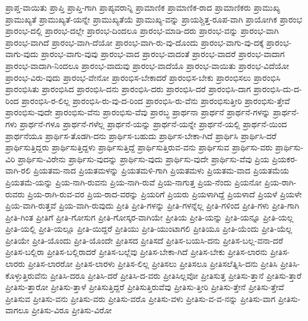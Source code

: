 {ಪ್ರಾಪ್ತ-ವಾಯಿತು
ಪ್ರಾಪ್ತಿ
ಪ್ರಾಪ್ತಿ-ಗಾಗಿ
ಪ್ರಾಪ್ಯವರಾನ್ನಿ
ಪ್ರಾಮಾಣಿಕ
ಪ್ರಾಮಾಣಿಕ-ರಾದ
ಪ್ರಾಮಾಣಿಕರು
ಪ್ರಾಮುಖ್ಯ
ಪ್ರಾಮುಖ್ಯತೆ
ಪ್ರಾಮುಖ್ಯತೆ-ಯನ್ನೇ
ಪ್ರಾಮುಖ್ಯತೆಯೆ
ಪ್ರಾಮುಖ್ಯ-ವನ್ನು
ಪ್ರಾಯಶ್ಚಿತ್ತ-ರೂಪ-ವಾಗಿ
ಪ್ರಾಯೋಗಿಕ
ಪ್ರಾರಂಭ
ಪ್ರಾರಂಭ-ದಲ್ಲಿ
ಪ್ರಾರಂಭ-ದಲ್ಲೇ
ಪ್ರಾರಂಭ-ದಿಂದಲೂ
ಪ್ರಾರಂಭ-ಮಾಡಿ-ದರು
ಪ್ರಾರಂಭ-ವನ್ನು
ಪ್ರಾರಂಭ-ವಾಗಿ
ಪ್ರಾರಂಭ-ವಾಗಿದೆ
ಪ್ರಾರಂಭ-ವಾಗಿ-ದೆಯೋ
ಪ್ರಾರಂಭ-ವಾಗಿ-ರು-ವು-ದೊಂದು
ಪ್ರಾರಂಭ-ವಾಗು-ವು-ದಕ್ಕೆ
ಪ್ರಾರಂಭ-ವಾಗು-ವುದು
ಪ್ರಾರಂಭ-ವಾಗು-ವುವು
ಪ್ರಾರಂಭ-ವಾದ
ಪ್ರಾರಂಭ-ವಾದಂತೆ
ಪ್ರಾರಂಭ-ವಾದರೆ
ಪ್ರಾರಂಭ-ವಾದಾಗ
ಪ್ರಾರಂಭ-ವಾದಾಗಿ-ನಿಂದಲೂ
ಪ್ರಾರಂಭ-ವಾದುವು
ಪ್ರಾರಂಭ-ವಾದೆಯೊ
ಪ್ರಾರಂಭ-ವಾಯಿತು
ಪ್ರಾರಂಭ-ವಿದೆಯೋ
ಪ್ರಾರಂಭ-ವಿರು-ವುದು
ಪ್ರಾರಂಭ-ವೇನೋ
ಪ್ರಾರಂಭಿಸ-ಬೇಕಾದರೆ
ಪ್ರಾರಂಭಿಸ-ಬೇಕು
ಪ್ರಾರಂಭಿಸಲು
ಪ್ರಾರಂಭಿಸಿ
ಪ್ರಾರಂಭಿಸಿತು
ಪ್ರಾರಂಭಿಸಿದ
ಪ್ರಾರಂಭಿಸಿ-ದನು
ಪ್ರಾರಂಭಿಸಿ-ದರು
ಪ್ರಾರಂಭಿಸಿ-ದರೆ
ಪ್ರಾರಂಭಿಸಿ-ದಾಗ
ಪ್ರಾರಂಭಿಸಿ-ದು-ದ-ರಿಂದ
ಪ್ರಾರಂಭಿಸಿ-ರ-ಲಿಲ್ಲ
ಪ್ರಾರಂಭಿಸಿ-ರು-ವು-ದ-ರಿಂದ
ಪ್ರಾರಂಭಿಸಿ-ರು-ವೆನು
ಪ್ರಾರಂಭಿಸುತ್ತೀರಿ
ಪ್ರಾರಂಭಿಸು-ತ್ತೇವೆ
ಪ್ರಾರಂಭಿಸು-ವುದೇ
ಪ್ರಾರಂಭಿಸು-ವೆನು
ಪ್ರಾರಂಭಿಸು-ವೆವು
ಪ್ರಾರಬ್ಧ
ಪ್ರಾರ್ಥನಾ
ಪ್ರಾರ್ಥನೆ
ಪ್ರಾರ್ಥನೆ-ಗಳನ್ನು
ಪ್ರಾರ್ಥನೆ-ಗಳು
ಪ್ರಾರ್ಥನೆ-ಗಳೂ
ಪ್ರಾರ್ಥನೆ-ಗಳೆಲ್ಲ
ಪ್ರಾರ್ಥನೆ-ಯನ್ನು
ಪ್ರಾರ್ಥನೆ-ಯನ್ನೇ
ಪ್ರಾರ್ಥನೆ-ಯಲ್ಲಿ
ಪ್ರಾರ್ಥನೆ-ಯಿಂದ
ಪ್ರಾರ್ಥನೆಯೂ
ಪ್ರಾರ್ಥಿಸ-ತೊಡಗಿ-ದನು
ಪ್ರಾರ್ಥಿಸ-ಬಹುದು
ಪ್ರಾರ್ಥಿಸ-ಬೇಕಾ-ಗಿದೆ
ಪ್ರಾರ್ಥಿಸಿ
ಪ್ರಾರ್ಥಿಸಿ-ದರೆ
ಪ್ರಾರ್ಥಿಸುತ್ತಿದ್ದರು
ಪ್ರಾರ್ಥಿಸುತ್ತಿದ್ದಳು
ಪ್ರಾರ್ಥಿಸುತ್ತಿದ್ದೆ
ಪ್ರಾರ್ಥಿಸುತ್ತಿರುವ-ವನು
ಪ್ರಾರ್ಥಿಸುವ
ಪ್ರಾರ್ಥಿಸು-ವರು
ಪ್ರಾರ್ಥಿಸು-ವಿರಿ
ಪ್ರಾರ್ಥಿಸು-ವಿರೇನು
ಪ್ರಾರ್ಥಿಸು-ವುದನ್ನು
ಪ್ರಾರ್ಥಿಸು-ವುದು
ಪ್ರಾರ್ಥಿಸು-ವುದೇ
ಪ್ರಾರ್ಥಿಸು-ವೆವು
ಪ್ರಿಯ
ಪ್ರಿಯಕರ-ವಾಗಿ-ರಲಿ
ಪ್ರಿಯತಮ-ನಾದ
ಪ್ರಿಯತಮಳನ್ನು
ಪ್ರಿಯತಮಳಿ-ಗಾಗಿ
ಪ್ರಿಯತಮಳು
ಪ್ರಿಯತಮ-ವಾದ
ಪ್ರಿಯತಮೆಯ
ಪ್ರಿಯತಮೆ-ಯನ್ನು
ಪ್ರಿಯ-ನಾಗಿ-ರುವನು
ಪ್ರಿಯ-ನಾಗಿ-ರುವೆ
ಪ್ರಿಯ-ನಾಗುತ್ತ
ಪ್ರಿಯ-ನೆಂದು
ಪ್ರಿಯನೋ
ಪ್ರಿಯ-ರಾಗಿ-ರುವರು
ಪ್ರಿಯ-ರಾಗಿ-ರುವ-ವರ
ಪ್ರಿಯ-ರಾದ-ವರನ್ನು
ಪ್ರಿಯರಿಗೆ
ಪ್ರಿಯರು
ಪ್ರಿಯಳಾಗಿದ್ದೆ
ಪ್ರಿಯಳಾದೆ
ಪ್ರಿಯಳೆ
ಪ್ರಿಯಳೇ
ಪ್ರಿಯ-ವಾಗಿ-ರುತ್ತವೆ
ಪ್ರಿಯ-ವಾಗಿ-ರುವುದು
ಪ್ರೀತಿ
ಪ್ರೀತಿ-ಗಳನ್ನು
ಪ್ರೀತಿ-ಗಳನ್ನೆಲ್ಲ
ಪ್ರೀತಿ-ಗಳಿಂದ
ಪ್ರೀತಿ-ಗಳು
ಪ್ರೀತಿ-ಗಾಗಿ
ಪ್ರೀತಿ-ಗಿಂತ
ಪ್ರೀತಿಗೆ
ಪ್ರೀತಿ-ಗೋಸುಗ
ಪ್ರೀತಿ-ಗೋಸ್ಕರ-ವಾಗಿಯೇ
ಪ್ರೀತಿಯ
ಪ್ರೀತಿ-ಯನ್ನು
ಪ್ರೀತಿ-ಯನ್ನೂ
ಪ್ರೀತಿ-ಯಲ್ಲ
ಪ್ರೀತಿ-ಯಲ್ಲಿ
ಪ್ರೀತಿ-ಯಲ್ಲೂ
ಪ್ರೀತಿ-ಯಿದ್ದರೆ
ಪ್ರೀತಿಯು
ಪ್ರೀತಿ-ಯುಂಟಾಗಲಿ
ಪ್ರೀತಿಯೂ
ಪ್ರೀತಿ-ಯೆಂದು
ಪ್ರೀತಿ-ಯೆಲ್ಲ
ಪ್ರೀತಿಯೇ
ಪ್ರೀತಿ-ಯೊಂದು
ಪ್ರೀತಿ-ಯೊಂದೇ
ಪ್ರೀತಿಸದ
ಪ್ರೀತಿಸದೆ
ಪ್ರೀತಿಸ-ಬಯಸಿ-ದನು
ಪ್ರೀತಿಸ-ಬಲ್ಲ-ವನಾ-ದರೆ
ಪ್ರೀತಿಸ-ಬಲ್ಲಿರಾ
ಪ್ರೀತಿಸ-ಬಲ್ಲಿರಾದರೆ
ಪ್ರೀತಿಸ-ಬಲ್ಲೆವು
ಪ್ರೀತಿಸ-ಬೇಕಾ-ಗಿದೆ
ಪ್ರೀತಿಸ-ಬೇಕು
ಪ್ರೀತಿಸ-ಲಾರನು
ಪ್ರೀತಿಸ-ಲಾರರು
ಪ್ರೀತಿಸ-ಲಾರರೋ
ಪ್ರೀತಿಸ-ಲಾರಳು
ಪ್ರೀತಿಸ-ಲಿಲ್ಲ
ಪ್ರೀತಿಸಲು
ಪ್ರೀತಿಸಲೂ
ಪ್ರೀತಿಸಲೆತ್ನಿಸಿ-ದನು
ಪ್ರೀತಿಸಿ
ಪ್ರೀತಿಸಿ-ಕೊಳ್ಳುತ್ತಿರುವೆನು
ಪ್ರೀತಿಸಿ-ದರೂ
ಪ್ರೀತಿಸಿ-ದರೆ
ಪ್ರೀತಿಸಿ-ದ-ವರು
ಪ್ರೀತಿಸಿಲ್ಲವೋ
ಪ್ರೀತಿಸುತ್ತ
ಪ್ರೀತಿಸು-ತ್ತಾನೆ
ಪ್ರೀತಿಸು-ತ್ತಾರೆ
ಪ್ರೀತಿಸು-ತ್ತಾರೋ
ಪ್ರೀತಿಸು-ತ್ತಾಳೆ
ಪ್ರೀತಿಸುತ್ತಿದ್ದರೆ
ಪ್ರೀತಿಸುತ್ತಿರುವೆವು
ಪ್ರೀತಿಸು-ತ್ತೀರಿ
ಪ್ರೀತಿಸು-ತ್ತೇನೆ
ಪ್ರೀತಿಸು-ತ್ತೇವೆ
ಪ್ರೀತಿಸುವ
ಪ್ರೀತಿಸು-ವನು
ಪ್ರೀತಿಸು-ವರು
ಪ್ರೀತಿಸು-ವರೊ
ಪ್ರೀತಿಸು-ವಳು
ಪ್ರೀತಿಸು-ವ-ವ-ನನ್ನು
ಪ್ರೀತಿಸು-ವಾಗ
ಪ್ರೀತಿಸು-ವಾಗಲೂ
ಪ್ರೀತಿಸು-ವಿರೂ
ಪ್ರೀತಿಸು-ವಿರೋ
}
